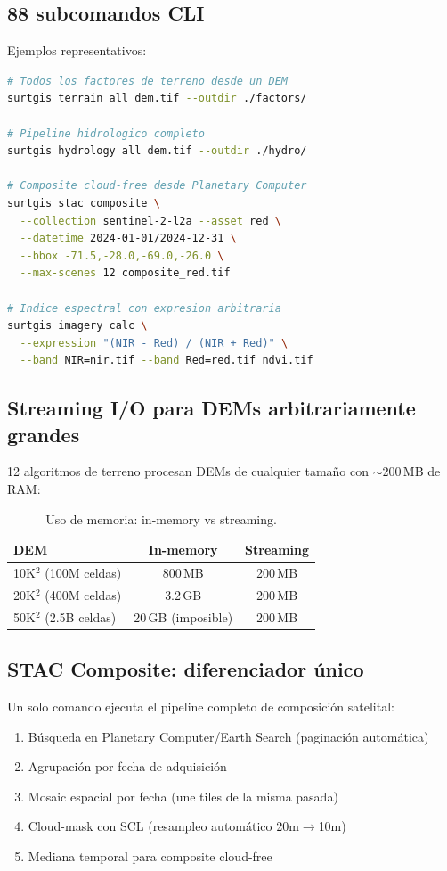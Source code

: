 \documentclass[11pt,a4paper]{article}
\begin{document}
\subsection{88 subcomandos CLI}

Ejemplos representativos:

\begin{lstlisting}[language=bash]
# Todos los factores de terreno desde un DEM
surtgis terrain all dem.tif --outdir ./factors/

# Pipeline hidrologico completo
surtgis hydrology all dem.tif --outdir ./hydro/

# Composite cloud-free desde Planetary Computer
surtgis stac composite \
  --collection sentinel-2-l2a --asset red \
  --datetime 2024-01-01/2024-12-31 \
  --bbox -71.5,-28.0,-69.0,-26.0 \
  --max-scenes 12 composite_red.tif

# Indice espectral con expresion arbitraria
surtgis imagery calc \
  --expression "(NIR - Red) / (NIR + Red)" \
  --band NIR=nir.tif --band Red=red.tif ndvi.tif
\end{lstlisting}

\subsection{Streaming I/O para DEMs arbitrariamente grandes}

12 algoritmos de terreno procesan DEMs de cualquier tama\~no con $\sim$200\,MB de RAM:

\begin{table}[h]
\centering
\small
\begin{tabular}{lcc}
\toprule
\textbf{DEM} & \textbf{In-memory} & \textbf{Streaming} \\
\midrule
10K$^2$ (100M celdas) & 800\,MB & 200\,MB \\
20K$^2$ (400M celdas) & 3.2\,GB & 200\,MB \\
50K$^2$ (2.5B celdas) & 20\,GB (imposible) & 200\,MB \\
\bottomrule
\end{tabular}
\caption{Uso de memoria: in-memory vs streaming.}
\end{table}

\subsection{STAC Composite: diferenciador \'unico}

Un solo comando ejecuta el pipeline completo de composici\'on satelital:
\begin{enumerate}[nosep]
\item B\'usqueda en Planetary Computer/Earth Search (paginaci\'on autom\'atica)
\item Agrupaci\'on por fecha de adquisici\'on
\item Mosaic espacial por fecha (une tiles de la misma pasada)
\item Cloud-mask con SCL (resampleo autom\'atico 20m$\to$10m)
\item Mediana temporal para composite cloud-free
\end{enumerate}
\end{document}
